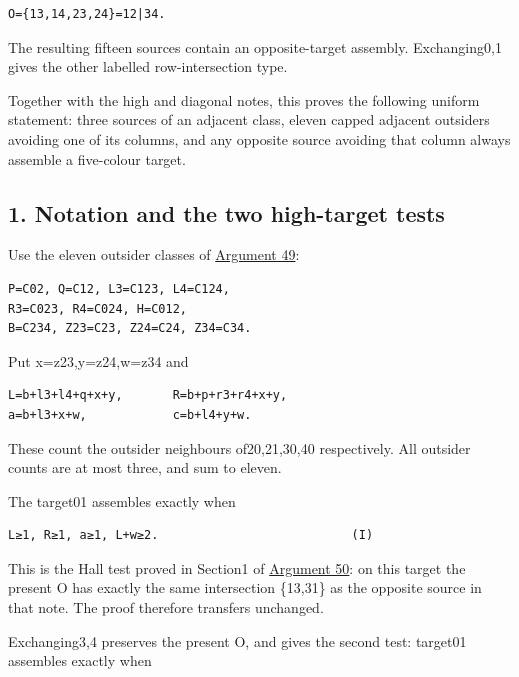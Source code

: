 \documentclass[
  10pt,
]{article}
\begin{document}
\begin{verbatim}
O={13,14,23,24}=12|34.
\end{verbatim}

The resulting fifteen sources contain an opposite-target assembly.
Exchanging0,1 gives the other labelled row-intersection type.

Together with the high and diagonal notes, this proves the following
uniform statement: three sources of an adjacent class, eleven capped
adjacent outsiders avoiding one of its columns, and any opposite source
avoiding that column always assemble a five-colour target.

\hypertarget{notation-and-the-two-high-target-tests}{%
\subsection*{1. Notation and the two high-target
tests}\label{notation-and-the-two-high-target-tests}}

Use the eleven outsider classes of \protect\hyperlink{arg-49}{Argument
49}:

\begin{verbatim}
P=C02, Q=C12, L3=C123, L4=C124,
R3=C023, R4=C024, H=C012,
B=C234, Z23=C23, Z24=C24, Z34=C34.
\end{verbatim}

Put x=z23,y=z24,w=z34 and

\begin{verbatim}
L=b+l3+l4+q+x+y,       R=b+p+r3+r4+x+y,
a=b+l3+x+w,            c=b+l4+y+w.
\end{verbatim}

These count the outsider neighbours of20,21,30,40 respectively. All
outsider counts are at most three, and sum to eleven.

The target01 assembles exactly when

\begin{verbatim}
L≥1, R≥1, a≥1, L+w≥2.                           (I)
\end{verbatim}

This is the Hall test proved in Section1 of
\protect\hyperlink{arg-50}{Argument 50}: on this target the present O
has exactly the same intersection \{13,31\} as the opposite source in
that note. The proof therefore transfers unchanged.

Exchanging3,4 preserves the present O, and gives the second test:
target01 assembles exactly when
\end{document}
